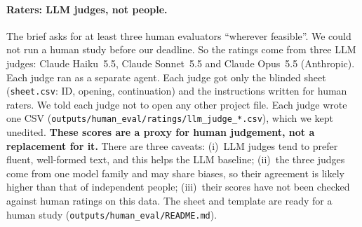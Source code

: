 \documentclass[11pt,a4paper]{article}
\begin{document}
\paragraph{Raters: LLM judges, not people.} The brief asks for at least three human evaluators
``wherever feasible''. We could not run a human study before our deadline. So the ratings come from
three LLM judges: Claude Haiku~5.5, Claude Sonnet~5.5 and Claude Opus~5.5 (Anthropic). Each judge
ran as a separate agent. Each judge got only the blinded sheet (\texttt{sheet.csv}: ID, opening,
continuation) and the instructions written for human raters. We told each judge not to open any
other project file. Each judge wrote one CSV (\texttt{outputs/human\_eval/ratings/llm\_judge\_*.csv}),
which we kept unedited. \textbf{These scores are a proxy for human judgement, not a replacement for
it.} There are three caveats: (i)~LLM judges tend to prefer fluent, well-formed text, and this helps
the LLM baseline; (ii)~the three judges come from one model family and may share biases, so their
agreement is likely higher than that of independent people; (iii)~their scores have not been checked
against human ratings on this data. The sheet and template are ready for a human study
(\texttt{outputs/human\_eval/README.md}).
\end{document}
